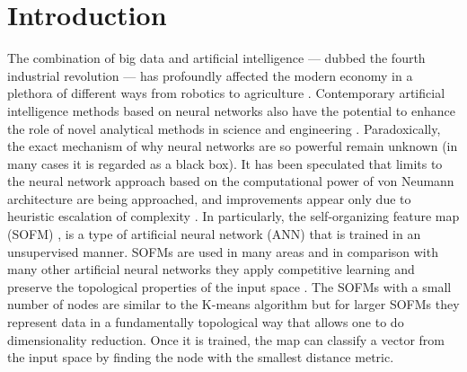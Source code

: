 \documentclass[pra,showkeys,twocolumn,showpacs]{revtex4-1}
\begin{document}
\section{Introduction}
The combination of big data and artificial intelligence ---  dubbed the fourth industrial revolution --- has profoundly affected the modern economy in a plethora of different ways from robotics to agriculture \cite{Lecun2015, ghahramani2015,schwab2017,esteva2019, tyrsa2017}. 
Contemporary artificial intelligence methods based on neural networks also have the potential to enhance the role of novel analytical methods in science and engineering \cite{kaggle2014, radovic2018, butler2018, radovic2018}. 
Paradoxically, the exact mechanism of why neural networks are so powerful remain unknown (in many cases it is regarded as a black box).  
It has been speculated that limits to the neural network approach based on the computational power of von Neumann architecture are being approached, and improvements appear only due to heuristic escalation of complexity \cite{marcus2018,sze2017,kourtis2020}.
In particularly, the self-organizing feature map (SOFM) \cite{kohonen1990,kohonen1996,kohonen1997}, is a type of artificial neural network (ANN) that is trained in an unsupervised manner. 
SOFMs are used in many areas \cite{vilibic2016, guido1998, doszkocs1990, jones2012,mori2019,corsello2017,zhu2018,chea2016} and in comparison with many other artificial neural networks they apply competitive learning and preserve the topological properties of the input space \cite{kiviluotoa1996}. 
The SOFMs with a small number of nodes are similar to the K-means algorithm but for larger SOFMs they represent data in a fundamentally topological way that allows one to do dimensionality reduction.
Once it is trained, the map can classify a vector from the input space by finding the node with the smallest distance metric. 
\end{document}
